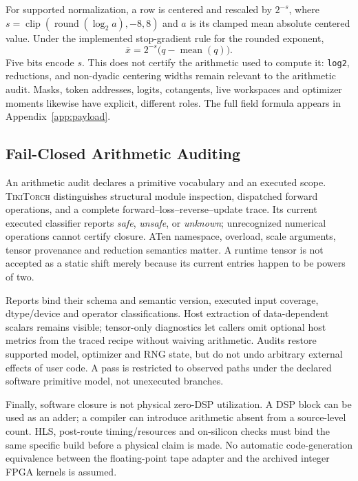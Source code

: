 \documentclass{article}
\theoremstyle{plain}
\theoremstyle{definition}
\theoremstyle{remark}
\newcommand{\ttorch}{\textsc{TikiTorch}}
\newcommand{\code}[1]{\texttt{#1}}
\begin{document}
For supported normalization, a row is centered and rescaled by $2^{-s}$,
where $s=\operatorname{clip}(\operatorname{round}(\log_2 a),-8,8)$ and $a$
is its clamped mean absolute centered value. Under the implemented
stop-gradient rule for the rounded exponent,
\begin{equation}
 \bar x=2^{-s}\bigl(q-\operatorname{mean}(q)\bigr).
\end{equation}
Five bits encode $s$. This does not certify the arithmetic used to compute
it: \code{log2}, reductions, and non-dyadic centering widths remain relevant
to the arithmetic audit. Masks, token addresses, logits, cotangents, live
workspaces and optimizer moments likewise have explicit, different roles.
The full field formula appears in Appendix~\ref{app:payload}.

\subsection{Fail-Closed Arithmetic Auditing}

An arithmetic audit declares a primitive vocabulary and an executed scope.
\ttorch{} distinguishes structural module inspection, dispatched forward
operations, and a complete forward--loss--reverse--update trace.
Its current executed classifier reports \emph{safe}, \emph{unsafe}, or
\emph{unknown}; unrecognized numerical operations cannot certify closure.
ATen namespace, overload, scale arguments, tensor provenance and reduction
semantics matter. A runtime tensor is not accepted as a static shift merely
because its current entries happen to be powers of two.

Reports bind their schema and semantic version, executed input coverage,
dtype/device and operator classifications. Host extraction of data-dependent
scalars remains visible; tensor-only diagnostics let callers omit optional
host metrics from the traced recipe without waiving arithmetic. Audits
restore supported model, optimizer and RNG state, but do not undo arbitrary
external effects of user code. A pass is restricted to observed paths under
the declared software primitive model, not unexecuted branches.

Finally, software closure is not physical zero-DSP utilization. A DSP block
can be used as an adder; a compiler can introduce arithmetic absent from a
source-level count. HLS, post-route timing/resources and on-silicon checks
must bind the same specific build before a physical claim is made. No
automatic code-generation equivalence between the floating-point tape
adapter and the archived integer FPGA kernels is assumed.
\end{document}
